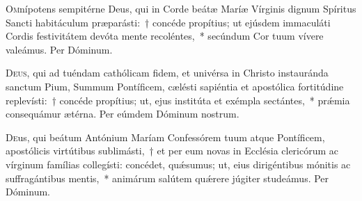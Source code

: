 \documentclass[vesperale_romanum.tex]{subfiles}
\begin{document}
\oratio
\lettrine{O}{m}nípotens sempitérne Deus, qui in Corde beátæ Maríæ Vírginis dignum Spíritus Sancti habitáculum præparásti:~† concéde propítius; ut ejúsdem immaculáti Cordis festivitátem devóta mente recoléntes,~* secúndum Cor tuum vívere valeámus. Per Dóminum.






\duplexmtv

\oratio
\lettrine{D}{eus}, qui ad tuéndam cathólicam fidem, et univérsa in Christo instauránda sanctum Pium, Summum Pontíficem, cælésti sapiéntia et apostólica fortitúdine replevísti:~† concéde propítius; ut, ejus institúta et exémpla se\-ctántes,~* prǽmia consequámur ætérna.
Per eúmdem Dóminum nostrum.

 

 
\oratio
\lettrine{D}{e}us,  qui beátum Antónium Maríam Confessórem tuum atque Pontíficem, apostólicis virtútibus sublimásti,~† et per eum novas in Ecclésia clericórum ac vírginum famílias collegísti: concédet, quǽsumus; ut, eius dirigéntibus mónitis ac suffragántibus mentis,~* animárum salútem quǽrere júgiter studeámus.
Per Dóminum.
\end{document}
